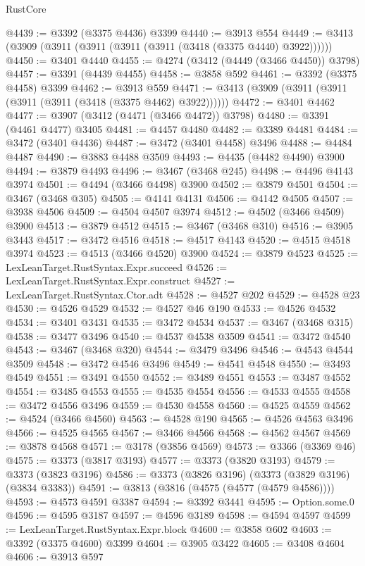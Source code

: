 \begin{lexlean}{RustCore}
\begin{coremodule}
@4439 := @3392 (@3375 @4436) @3399
@4440 := @3913 @554
@4449 := @3413 (@3909 (@3911 (@3911 (@3911 (@3911 (@3418 (@3375 @4440) @3922))))))
@4450 := @3401 @4440
@4455 := @4274 (@3412 (@4449 (@3466 @4450)) @3798)
@4457 := @3391 (@4439 @4455)
@4458 := @3858 @592
@4461 := @3392 (@3375 @4458) @3399
@4462 := @3913 @559
@4471 := @3413 (@3909 (@3911 (@3911 (@3911 (@3911 (@3418 (@3375 @4462) @3922))))))
@4472 := @3401 @4462
@4477 := @3907 (@3412 (@4471 (@3466 @4472)) @3798)
@4480 := @3391 (@4461 @4477) @3405
@4481 := @4457 @4480
@4482 := @3389 @4481
@4484 := @3472 (@3401 @4436)
@4487 := @3472 (@3401 @4458) @3496
@4488 := @4484 @4487
@4490 := @3883 @4488 @3509
@4493 := @4435 (@4482 @4490) @3900
@4494 := @3879 @4493
@4496 := @3467 (@3468 @245)
@4498 := @4496 @4143 @3974
@4501 := @4494 (@3466 @4498) @3900
@4502 := @3879 @4501
@4504 := @3467 (@3468 @305)
@4505 := @4141 @4131
@4506 := @4142 @4505
@4507 := @3938 @4506
@4509 := @4504 @4507 @3974
@4512 := @4502 (@3466 @4509) @3900
@4513 := @3879 @4512
@4515 := @3467 (@3468 @310)
@4516 := @3905 @3443
@4517 := @3472 @4516
@4518 := @4517 @4143
@4520 := @4515 @4518 @3974
@4523 := @4513 (@3466 @4520) @3900
@4524 := @3879 @4523
@4525 := LexLeanTarget.RustSyntax.Expr.succeed
@4526 := LexLeanTarget.RustSyntax.Expr.construct
@4527 := LexLeanTarget.RustSyntax.Ctor.adt
@4528 := @4527 @202
@4529 := @4528 @23
@4530 := @4526 @4529
@4532 := @4527 @46 @190
@4533 := @4526 @4532
@4534 := @3401 @3431
@4535 := @3472 @4534
@4537 := @3467 (@3468 @315)
@4538 := @3477 @3496
@4540 := @4537 @4538 @3509
@4541 := @3472 @4540
@4543 := @3467 (@3468 @320)
@4544 := @3479 @3496
@4546 := @4543 @4544 @3509
@4548 := @3472 @4546 @3496
@4549 := @4541 @4548
@4550 := @3493 @4549
@4551 := @3491 @4550
@4552 := @3489 @4551
@4553 := @3487 @4552
@4554 := @3485 @4553
@4555 := @4535 @4554
@4556 := @4533 @4555
@4558 := @3472 @4556 @3496
@4559 := @4530 @4558
@4560 := @4525 @4559
@4562 := @4524 (@3466 @4560)
@4563 := @4528 @190
@4565 := @4526 @4563 @3496
@4566 := @4525 @4565
@4567 := @3466 @4566
@4568 := @4562 @4567
@4569 := @3878 @4568
@4571 := @3178 (@3856 @4569)
@4573 := @3366 (@3369 @46)
@4575 := @3373 (@3817 @3193)
@4577 := @3373 (@3820 @3193)
@4579 := @3373 (@3823 @3196)
@4586 := @3373 (@3826 @3196) (@3373 (@3829 @3196) (@3834 @3383))
@4591 := @3813 (@3816 (@4575 (@4577 (@4579 @4586))))
@4593 := @4573 @4591 @3387
@4594 := @3392 @3441
@4595 := Option.some.{0}
@4596 := @4595 @3187
@4597 := @4596 @3189
@4598 := @4594 @4597
@4599 := LexLeanTarget.RustSyntax.Expr.block
@4600 := @3858 @602
@4603 := @3392 (@3375 @4600) @3399
@4604 := @3905 @3422
@4605 := @3408 @4604
@4606 := @3913 @597

\end{coremodule}
\end{lexlean}
